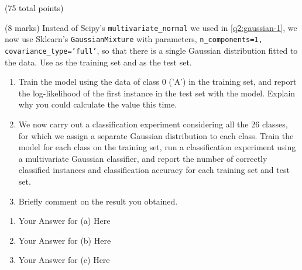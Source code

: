 \documentclass[12pt]{article}
\begin{document}
\begin{question}{(75 total points) \qTwoTitle}
\begin{subquestion}
  

\end{subquestion}

\begin{subquestion}{(8 marks)
    Instead of Scipy's {\tt multivariate\_normal} we used in \ref{q2:gaussian-1}, we now use Sklearn's {\tt GaussianMixture} with parameters, {\tt n\_components=1, covariance\_type='full'},
    so that there is a single Gaussian distribution fitted to the data.
    Use  as the training set and  as the test set.
  } \label{q2:gaussian-2}
  \begin{enumerate}\NARROWITEM
  \item Train the model using the data of class 0 ('A') in the training set, and report  the log-likelihood of the first instance in the test set with the model. Explain why you could calculate the value this time.
  \item We now carry out a classification experiment considering all the 26 classes, for which we assign a separate Gaussian distribution to each class.
    Train the model for each class on the training set, run a classification experiment using a multivariate Gaussian classifier, and report the number of correctly classified instances and classification accuracy for each training set and test set. 
  \item Briefly comment on the result you obtained.
  \end{enumerate}
   

  \begin{answerbox}{0.6\textheight}
    \begin{enumerate}
    \item Your Answer for (a) Here
    \item Your Answer for (b) Here
    \item Your Answer for (c) Here
    \end{enumerate}
  \end{answerbox}
  


\end{subquestion}


\end{question}
\end{document}
